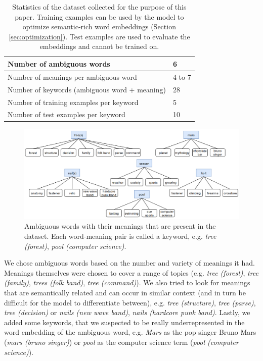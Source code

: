 \documentclass{llncs}
\begin{document}
\begin{table}
\centering
    \begin{tabular}{ | m{7.5cm} | m{1cm} | }
        \hline
        Number of ambiguous words & 6 \\
        \hline
        Number of meanings per ambiguous word & 4 to 7 \\
        \hline
        Number of keywords (ambiguous word + meaning) & 28 \\
    \hline
    \hline
    Number of training examples per keyword & 5 \\
    \hline
    Number of test examples per keyword & 10 \\
    \hline
    \end{tabular}
    \caption{Statistics of the dataset collected for the purpose of this paper. Training examples can be used by the model to optimize semantic-rich word embeddings (Section \ref{sec:optimization}). Test examples are used to evaluate the embeddings and cannot be trained on.}
    \label{table:dataset}
\end{table}

\begin{figure}
    \centering
    \caption{Ambiguous words with their meanings that are present in the dataset. Each word-meaning pair is called a keyword, e.g. \textit{tree (forest)}, \textit{pool (computer science)}.}
    \label{fig:keywords}
    \includegraphics[scale=0.35]{res/keywords.png}
\end{figure}

We chose ambiguous words based on the number and variety of meanings it had.
Meanings themselves were chosen to cover a range of topics (e.g. \textit{tree (forest)}, \textit{tree (family)}, \textit{trees (folk band)}, \textit{tree (command)}).
We also tried to look for meanings that are semantically related and can occur in similar context (and in turn be difficult for the model to differentiate between), e.g. \textit{tree (structure)}, \textit{tree (parse)}, \textit{tree (decision)} or \textit{nails (new wave band)}, \textit{nails (hardcore punk band)}.
Lastly, we added some keywords, that we suspected to be really underrepresented in the word embedding of the ambiguous word, e.g. \textit{Mars} as the pop singer Bruno Mars (\textit{mars (bruno singer)}) or \textit{pool} as the computer science term (\textit{pool (computer science)}).
\end{document}
